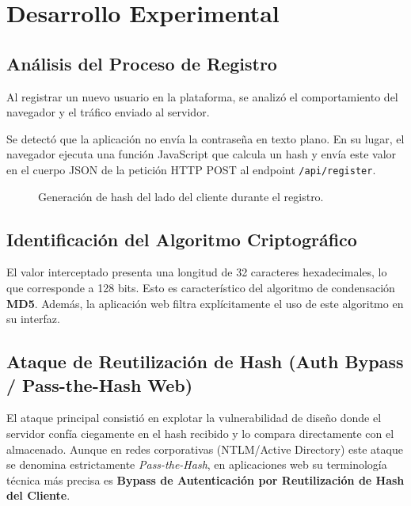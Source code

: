 \documentclass[12pt,a4paper]{article}
\begin{document}
\section{Desarrollo Experimental}

\subsection{Análisis del Proceso de Registro}
Al registrar un nuevo usuario en la plataforma, se analizó el comportamiento del navegador y el tráfico enviado al servidor.

\begin{tcolorbox}[colback=blue!5!white,colframe=blue!75!black,title=Observación]
Se detectó que la aplicación no envía la contraseña en texto plano. En su lugar, el navegador ejecuta una función JavaScript que calcula un hash y envía este valor en el cuerpo JSON de la petición HTTP POST al endpoint \texttt{/api/register}.
\end{tcolorbox}

\begin{figure}[H]
    \centering
    \caption{Generación de hash del lado del cliente durante el registro.}
\end{figure}

\subsection{Identificación del Algoritmo Criptográfico}
El valor interceptado presenta una longitud de 32 caracteres hexadecimales, lo que corresponde a 128 bits. Esto es característico del algoritmo de condensación \textbf{MD5}. Además, la aplicación web filtra explícitamente el uso de este algoritmo en su interfaz.

\subsection{Ataque de Reutilización de Hash (Auth Bypass / Pass-the-Hash Web)}
El ataque principal consistió en explotar la vulnerabilidad de diseño donde el servidor confía ciegamente en el hash recibido y lo compara directamente con el almacenado. Aunque en redes corporativas (NTLM/Active Directory) este ataque se denomina estrictamente \textit{Pass-the-Hash}, en aplicaciones web su terminología técnica más precisa es \textbf{Bypass de Autenticación por Reutilización de Hash del Cliente}.
\end{document}
